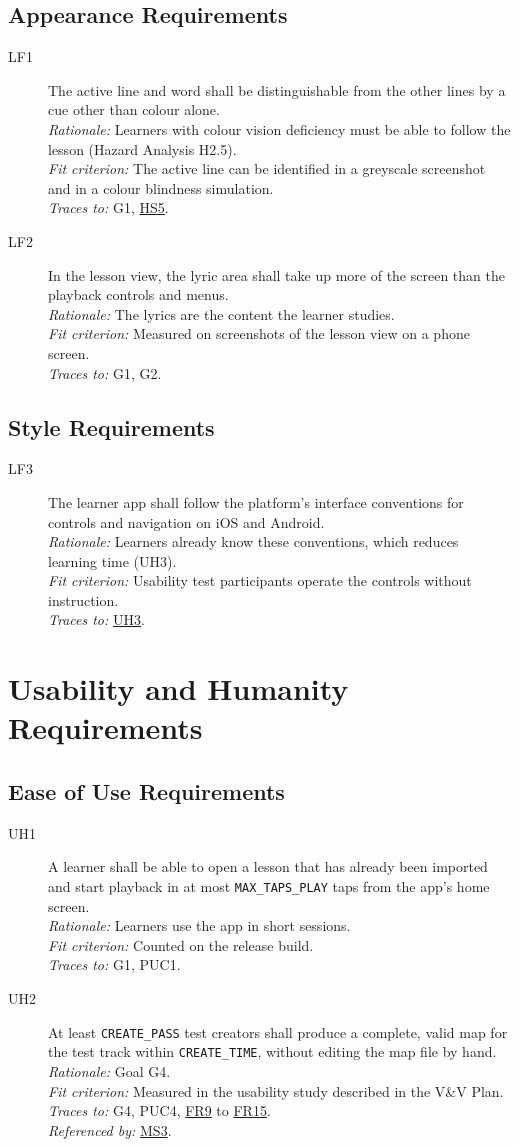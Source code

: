 \documentclass[12pt]{article}
\newcommand{\cn}[1]{\texttt{#1}}
\newcommand{\rat}[1]{\\\textit{Rationale:} #1}
\newcommand{\fit}[1]{\\\textit{Fit criterion:} #1}
\newcommand{\trace}[1]{\\\textit{Traces to:} #1}
\newcommand{\usedby}[1]{\\\textit{Referenced by:} #1}
\newcommand{\reqdef}[1]{\hypertarget{req:#1}{#1}}
\newcommand{\req}[1]{\hyperlink{req:#1}{#1}}
\begin{document}
\subsection{Appearance Requirements}
\begin{description}
\item[\reqdef{LF1}] The active line and word shall be distinguishable from the other
lines by a cue other than colour alone.
\rat{Learners with colour vision deficiency must be able to follow the lesson
(Hazard Analysis H2.5).}
\fit{The active line can be identified in a greyscale screenshot and in a
colour blindness simulation.}
\trace{G1, \req{HS5}.}

\item[\reqdef{LF2}] In the lesson view, the lyric area shall take up more of the screen
than the playback controls and menus.
\rat{The lyrics are the content the learner studies.}
\fit{Measured on screenshots of the lesson view on a phone screen.}
\trace{G1, G2.}
\end{description}

\subsection{Style Requirements}
\begin{description}
\item[\reqdef{LF3}] The learner app shall follow the platform's interface conventions
for controls and navigation on iOS and Android.
\rat{Learners already know these conventions, which reduces learning time
(UH3).}
\fit{Usability test participants operate the controls without instruction.}
\trace{\req{UH3}.}
\end{description}

\section{Usability and Humanity Requirements}
\subsection{Ease of Use Requirements} \label{SecUH}
\begin{description}
\item[\reqdef{UH1}] A learner shall be able to open a lesson that has already been
imported and start playback in at most \cn{MAX\_TAPS\_PLAY} taps from the
app's home screen.
\rat{Learners use the app in short sessions.}
\fit{Counted on the release build.}
\trace{G1, PUC1.}

\item[\reqdef{UH2}] At least \cn{CREATE\_PASS} test creators shall produce a complete,
valid map for the test track within \cn{CREATE\_TIME}, without editing the map
file by hand.
\rat{Goal G4.}
\fit{Measured in the usability study described in the V\&V Plan.}
\trace{G4, PUC4, \req{FR9} to \req{FR15}.}
\usedby{\req{MS3}.}
\end{description}
\end{document}
